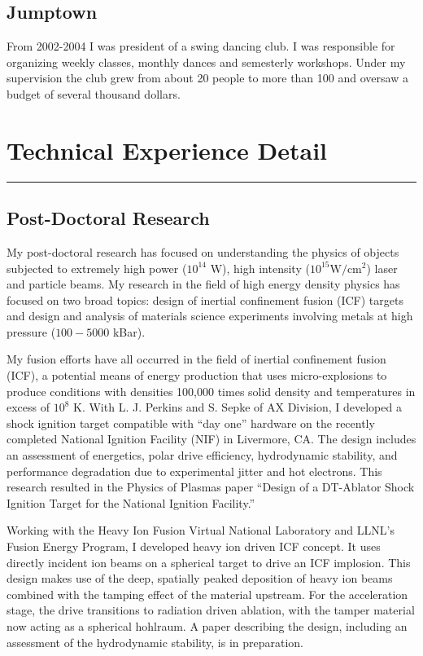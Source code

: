 \documentclass[letterpaper,11pt]{article}
\newcommand{\sectionline}{\vspace{-0.05in}\hrule\vspace{0.05in}}
\begin{document}
\subsection*{Jumptown}
From 2002-2004 I was president of a swing dancing club.  I was responsible for
organizing weekly classes, monthly dances and semesterly workshops.  Under my
supervision the club grew from about 20 people to more than 100 and oversaw a
budget of several thousand dollars.


\section*{Technical Experience Detail}
\sectionline

\subsection*{Post-Doctoral Research}
My post-doctoral research has focused on understanding the physics of objects
subjected to extremely high power ($10^{14}$ W), high intensity ($10^{15}
\text{W}/\text{cm}^2$) laser and particle beams.  My research in the field of
high energy density physics has focused on two broad topics: design of inertial
confinement fusion (ICF) targets and design and analysis of materials science
experiments involving metals at high pressure ($100 - 5000$ kBar).

My fusion efforts have all occurred in the field of inertial confinement fusion
(ICF), a potential means of energy production that uses micro-explosions to
produce conditions with densities 100,000 times solid density and temperatures
in excess of $10^8$ K.  With L. J. Perkins and S. Sepke of AX Division, I
developed a shock ignition target compatible with ``day one'' hardware on the
recently completed National Ignition Facility (NIF) in Livermore, CA\@.  The
design includes an assessment of energetics, polar drive efficiency,
hydrodynamic stability, and performance degradation due to experimental jitter
and hot electrons.  This research resulted in the Physics of Plasmas paper
``Design of a DT-Ablator Shock Ignition Target for the National Ignition
Facility.''

Working with the Heavy Ion Fusion Virtual National Laboratory and LLNL's Fusion
Energy Program, I developed heavy ion driven ICF concept. It uses directly
incident ion beams on a spherical target to drive an ICF implosion.  This
design makes use of the deep, spatially peaked deposition of heavy ion beams
combined with the tamping effect of the material upstream.  For the
acceleration stage, the drive transitions to radiation driven ablation, with
the tamper material now acting as a spherical hohlraum.  A paper describing the
design, including an assessment of the hydrodynamic stability, is in
preparation.  
\end{document}
